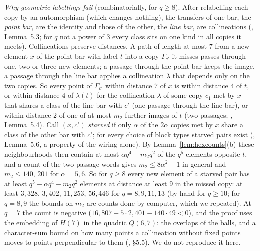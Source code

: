 \documentclass[11pt]{amsart}
\theoremstyle{definition}
\theoremstyle{remark}
\begin{document}
\emph{Why geometric labellings fail} (combinatorially, for $q\ge8$). After relabelling each copy by an automorphism (which changes nothing), the transfers of one bar, the \emph{point bar}, are the identity and those of the other, the \emph{line bar}, are collineations (, Lemma~5.3; for $q$ not a power of $3$ every class sits on one kind in all copies it meets). Collineations preserve distances. A path of length at most $7$ from a new element $x$ of the point bar with label $t$ into a copy $\Gamma_{c'}$ it misses passes through one, two or three new elements; a passage through the point bar keeps the image, a passage through the line bar applies a collineation $\lambda$ that depends only on the two copies. So every point of $\Gamma_{c'}$ within distance $7$ of $x$ is within distance $4$ of $t$, or within distance $4$ of $\lambda(t)$ for the collineation $\lambda$ of some copy $c_1$ met by $x$ that shares a class of the line bar with $c'$ (one passage through the line bar), or within distance $2$ of one of at most $m_2$ further images of $t$ (two passages; , Lemma~5.4). Call $(x,c')$ \emph{starved} if only $\alpha$ of the $2\alpha$ copies met by $x$ share a class of the other bar with $c'$; for every choice of block types starved pairs exist (, Lemma~5.6, a property of the wiring alone). By Lemma~\ref{lem:hexcounts}(b) these neighbourhoods then contain at most $\alpha q^4+m_2q^2$ of the $q^5$ elements opposite $t$, and a count of the two-passage words gives $m_2\le 8\alpha^2-1$ in general and $m_2\le140$, $201$ for $\alpha=5,6$. So for $q\ge8$ every new element of a starved pair has at least $q^5-\alpha q^4-m_2q^2$ elements at distance at least $9$ in the missed copy: at least $3{,}328$, $3{,}402$, $11{,}253$, $56{,}446$ for $q=8,9,11,13$ (by hand for $q\ge10$; for $q=8,9$ the bounds on $m_2$ are counts done by computer, which we repeated). At $q=7$ the count is negative ($16{,}807-5\cdot2{,}401-140\cdot49<0$), and the proof uses the embedding of $H(7)$ in the quadric $Q(6,7)$: the overlaps of the balls, and a character-sum bound on how many points a collineation without fixed points moves to points perpendicular to them (, \S5.5). We do not reproduce it here.
\end{document}
